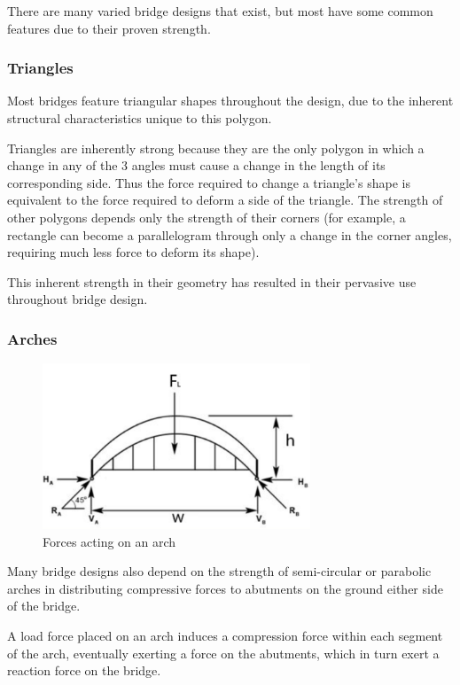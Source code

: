\documentclass[a4paper,11pt]{article}
\begin{document}
There are many varied bridge designs that exist, but most have some common
features due to their proven strength.


\subsubsection{Triangles}

Most bridges feature triangular shapes throughout the design, due to the
inherent structural characteristics unique to this polygon.

Triangles are inherently strong because they are the only polygon in which
a change in any of the 3 angles must cause a change in the length of its
corresponding side.
Thus the force required to change a triangle's shape is equivalent to the force
required to deform a side of the triangle.
The strength of other polygons depends only the strength of their corners (for
example, a rectangle can become a parallelogram through only a change in the
corner angles, requiring much less force to deform its shape).

This inherent strength in their geometry has resulted in their pervasive use
throughout bridge design.


\subsubsection{Arches}

\begin{figure}
\begin{center}
\includegraphics[width=8cm]{figures/arch.png}
\end{center}
\caption{Forces acting on an arch}
\label{research:arch}
\end{figure}

Many bridge designs also depend on the strength of semi-circular or parabolic
arches in distributing compressive forces to abutments on the ground either side
of the bridge.

A load force placed on an arch induces a compression force within each segment
of the arch, eventually exerting a force on the abutments, which in turn exert
a reaction force on the bridge.
\end{document}
